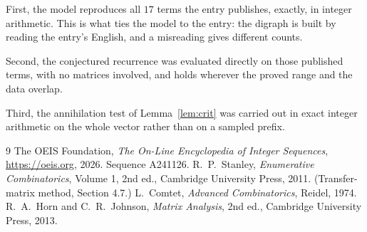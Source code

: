 \documentclass[11pt,a4paper]{article}
\theoremstyle{plain}
\theoremstyle{definition}
\begin{document}
First, the model reproduces all $17$ terms the entry publishes, exactly, in integer
arithmetic. This is what ties the model to the entry: the digraph is built by reading the
entry's English, and a misreading gives different counts.

Second, the conjectured recurrence was evaluated directly on those published terms, with no
matrices involved, and holds wherever the proved range and the data overlap.

Third, the annihilation test of Lemma~\ref{lem:crit} was carried out in exact integer
arithmetic on the whole vector rather than on a sampled prefix.

\begin{thebibliography}{9}
 The OEIS Foundation, \emph{The On-Line Encyclopedia of Integer
Sequences}, \url{https://oeis.org}, 2026. Sequence A241126.
 R.~P.~Stanley, \emph{Enumerative Combinatorics}, Volume 1, 2nd ed.,
Cambridge University Press, 2011. (Transfer-matrix method, Section 4.7.)
 L.~Comtet, \emph{Advanced Combinatorics}, Reidel, 1974.
 R.~A.~Horn and C.~R.~Johnson, \emph{Matrix Analysis}, 2nd ed., Cambridge
University Press, 2013.
\end{thebibliography}
\end{document}
